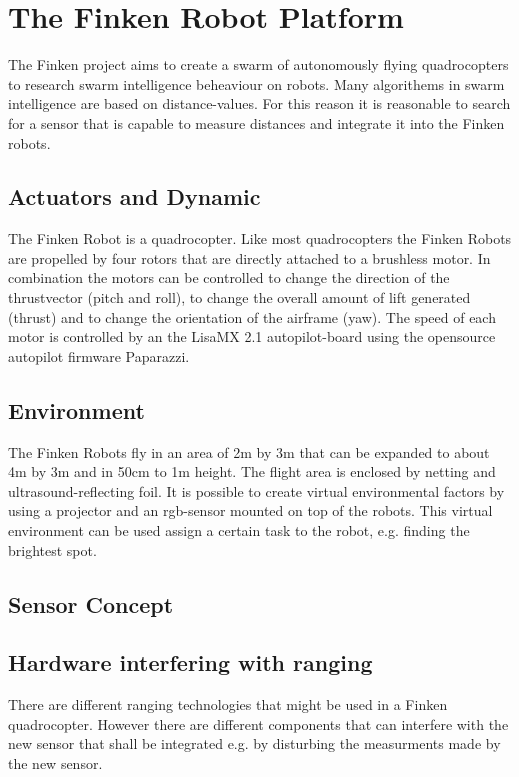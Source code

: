 \section{The Finken Robot Platform}


The Finken project aims to create a swarm of autonomously flying quadrocopters to research swarm intelligence beheaviour on robots.
Many algorithems in swarm intelligence are based on distance-values. 
For this reason it is reasonable to search for a sensor that is capable to measure distances and integrate it into the Finken robots. 

\subsection{Actuators and Dynamic}
The Finken Robot is a quadrocopter.
Like most quadrocopters the Finken Robots are propelled by four rotors that are directly attached to a brushless motor.
In combination the motors can be controlled to change the direction of the thrustvector (pitch and roll), to change the overall amount of lift generated (thrust) and to change the orientation of the airframe (yaw).
The speed of each motor is controlled by an the Lisa\/MX 2.1 autopilot-board\cite{_lisa/mx_????} using the opensource autopilot firmware Paparazzi\cite{_paparazziuav_????}.

\subsection{Environment}
The Finken Robots fly in an area of 2m by 3m that can be expanded to about 4m by 3m and in 50cm to 1m height.
The flight area is enclosed by netting and ultrasound-reflecting foil.
It is possible to create virtual environmental factors by using a projector and an rgb-sensor mounted on top of the robots.
This virtual environment can be used assign a certain task to the robot, e.g. finding the brightest spot.

\subsection{Sensor Concept}

\subsection{Hardware interfering with ranging}
There are different ranging technologies that might be used in a Finken quadrocopter.
However there are different components that can interfere with the new sensor that shall be integrated e.g. by disturbing the measurments made by the new sensor.

